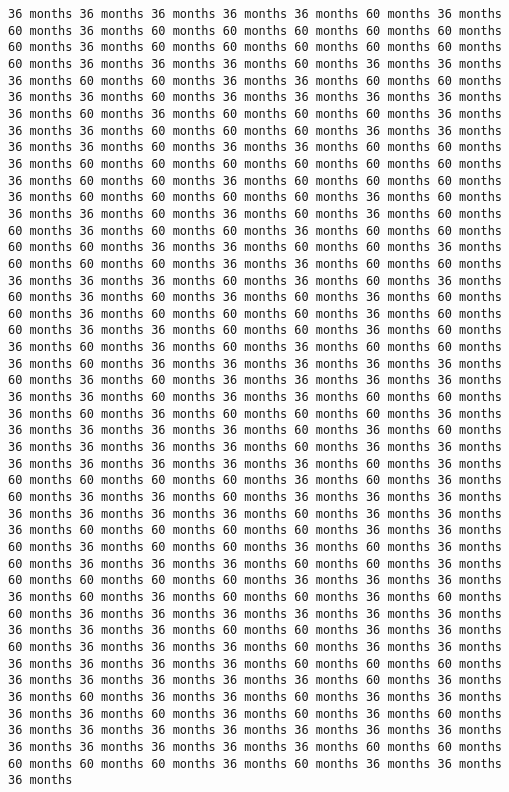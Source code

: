 \documentclass[11pt]{article}
\begin{document}
\begin{Verbatim}[commandchars=\\\{\}, frame=single, framerule=2mm, rulecolor=\color{outerrorbackground}]
36 months 36 months 36 months 36 months 36 months 60 months 36 months 60 months 36 months 60 months 60 months 60 months 60 months 60 months 60 months 36 months 60 months 60 months 60 months 60 months 60 months 60 months 36 months 36 months 36 months 60 months 36 months 36 months 36 months 60 months 60 months 36 months 36 months 60 months 60 months 36 months 36 months 60 months 36 months 36 months 36 months 36 months 36 months 60 months 36 months 60 months 60 months 60 months 36 months 36 months 36 months 60 months 60 months 60 months 36 months 36 months 36 months 36 months 60 months 36 months 36 months 60 months 60 months 36 months 60 months 60 months 60 months 60 months 60 months 60 months 36 months 60 months 60 months 36 months 60 months 60 months 60 months 36 months 60 months 60 months 60 months 60 months 36 months 60 months 36 months 36 months 60 months 36 months 60 months 36 months 60 months 60 months 36 months 60 months 60 months 36 months 60 months 60 months 60 months 60 months 36 months 36 months 60 months 60 months 36 months 60 months 60 months 60 months 36 months 36 months 60 months 60 months 36 months 36 months 36 months 60 months 36 months 60 months 36 months 60 months 36 months 60 months 36 months 60 months 36 months 60 months 60 months 36 months 60 months 60 months 60 months 36 months 60 months 60 months 36 months 36 months 60 months 60 months 36 months 60 months 36 months 60 months 36 months 60 months 36 months 60 months 60 months 36 months 60 months 36 months 36 months 36 months 36 months 36 months 60 months 36 months 60 months 36 months 36 months 36 months 36 months 36 months 36 months 60 months 36 months 36 months 60 months 60 months 36 months 60 months 36 months 60 months 60 months 60 months 36 months 36 months 36 months 36 months 36 months 60 months 36 months 60 months 36 months 36 months 36 months 36 months 60 months 36 months 36 months 36 months 36 months 36 months 36 months 36 months 60 months 36 months 60 months 60 months 60 months 60 months 36 months 60 months 36 months 60 months 36 months 36 months 60 months 36 months 36 months 36 months 36 months 36 months 36 months 36 months 60 months 36 months 36 months 36 months 60 months 60 months 60 months 60 months 36 months 36 months 60 months 36 months 60 months 60 months 36 months 60 months 36 months 60 months 36 months 36 months 36 months 60 months 60 months 36 months 60 months 60 months 60 months 60 months 36 months 36 months 36 months 36 months 60 months 36 months 60 months 60 months 36 months 60 months 60 months 36 months 36 months 36 months 36 months 36 months 36 months 36 months 36 months 36 months 60 months 60 months 36 months 36 months 60 months 36 months 36 months 36 months 60 months 36 months 36 months 36 months 36 months 36 months 36 months 60 months 60 months 60 months 36 months 36 months 36 months 36 months 36 months 60 months 36 months 36 months 60 months 36 months 36 months 60 months 36 months 36 months 36 months 36 months 60 months 36 months 60 months 36 months 60 months 36 months 36 months 36 months 36 months 36 months 36 months 36 months 36 months 36 months 36 months 36 months 36 months 60 months 60 months 60 months 60 months 60 months 36 months 60 months 36 months 36 months 36 months 
\end{Verbatim}
\end{document}
